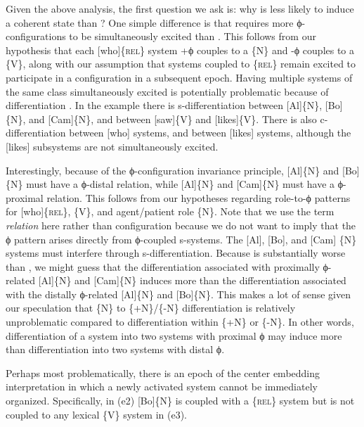   Given the above analysis, the first question we ask is: why is  less likely to induce a coherent state than ? One simple difference is that  requires more ϕ-configurations to be simultaneously excited than . This follows from our hypothesis that each [who]\{\textsc{rel}\} system +ϕ couples to a \{N\} and -ϕ couples to a \{V\}, along with our assumption that systems coupled to \{\textsc{rel}\} remain excited to participate in a configuration in a subsequent epoch. Having multiple systems of the same class simultaneously excited is potentially problematic because of differentiation . In the example there is s-differentiation  between [Al]\{N\}, [Bo]\{N\}, and [Cam]\{N\}, and between [saw]\{V\} and [likes]\{V\}. There is also c-differentiation  between [who] systems, and between [likes] systems, although the [likes] subsystems are not simultaneously excited. 

  Interestingly, because of the ϕ-configuration invariance principle, [Al]\{N\} and [Bo]\{N\} must have a ϕ-distal relation, while [Al]\{N\} and [Cam]\{N\} must have a ϕ-proximal relation. This follows from our hypotheses regarding role-to-ϕ patterns for [who]\{\textsc{rel}\},  \{V\}, and agent/patient role \{N\}. Note that we use the term \textit{relation} here rather than configuration because we do not want to imply that the ϕ pattern arises directly from ϕ-coupled s-systems. The [Al], [Bo], and [Cam] \{N\} systems must interfere through s-differentiation. Because  is substantially worse than , we might guess that the differentiation associated with proximally ϕ-related [Al]\{N\} and [Cam]\{N\} induces more  than the differentiation associated with the distally ϕ-related [Al]\{N\} and [Bo]\{N\}. This makes a lot of sense given our speculation that \{N\} to \{+N\}/\{-N\} differentiation is relatively unproblematic compared to differentiation within \{+N\} or \{-N\}. In other words, differentiation of a system into two systems with proximal ϕ may induce more  than differentiation into two systems with distal ϕ.

  Perhaps most problematically, there is an epoch of the center embedding interpretation in which a newly activated system cannot be immediately organized. Specifically, in (e2) [Bo]\{N\} is coupled with a \{\textsc{rel}\} system but is not coupled to any lexical \{V\} system in (e3). 

